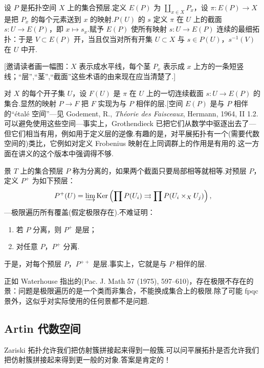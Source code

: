 \begin{aside}\label{asd:7.18}
设 $P$ 是拓扑空间 $X$ 上的集合预层.定义 $E(P)$ 为 $\coprod_{x \in X} P_x$，设 $\pi \colon E(P) \to X$ 是把 $P_x$ 的每个元素送到 $x$ 的映射.$P(U)$ 的 $s$ 定义 $\pi$ 在 $U$ 上的截面 $s \colon U \to E(P)$，即 $x \mapsto s_x$.赋予 $E(P)$ 使所有映射 $s \colon U \to E(P)$ 连续的最细拓扑：于是 $V \subset E(P)$ 开，当且仅当对所有开集 $U \subset X$ 与 $s \in P(U)$，$s^{-1}(V)$ 在 $U$ 中开.

[邀请读者画一幅图：$X$ 表示成水平线，每个茎 $P_x$ 表示成 $x$ 上方的一条短竖线；``层'',``茎'',``截面''这些术语的由来现在应当清楚了.]

对 $X$ 的每个开子集 $U$，设 $F(U)$ 是 $\pi$ 在 $U$ 上的一切连续截面 $s \colon U \to E(P)$ 的集合.显然的映射 $P \to F$ 把 $F$ 实现为与 $P$ 相伴的层.[空间 $E(P)$ 是与 $P$ 相伴的``\'etal\'e 空间''---见 Godement, R., \emph{Th\'eorie des Faisceaux}, Hermann, 1964, II 1.2.可以避免使用这些空间---事实上，Grothendieck 已把它们从数学中驱逐出去了---但它们相当有用，例如用于定义层的逆像.有趣的是，对平展拓扑有一个(需要代数空间的)类比，它例如对定义 Frobenius 映射在上同调群上的作用是有用的.这一方面在讲义的这个版本中强调得不够.
\end{aside}

\begin{aside}\label{asd:7.19}
景 $T$ 上的集合预层 $P$ 称为分离的，如果两个截面只要局部相等就相等.对预层 $P$，定义 $P^{+}$ 为如下预层：
\[
P^{+}(U) = \varinjlim \operatorname{Ker}\left( \prod P(U_i) \rightrightarrows \prod P(U_i \times_{X} U_j) \right),
\]
---极限遍历所有覆盖(假定极限存在).不难证明：
\begin{enumerate}
  \item 若 $P$ 分离，则 $P^{+}$ 是层；
  \item 对任意 $P$，$P^{+}$ 分离.
\end{enumerate}
于是，对每个预层 $P$，$P^{++}$ 是层.事实上，它就是与 $P$ 相伴的层.

正如 Waterhouse 指出的(Pac. J. Math 57 (1975), 597--610)，存在极限不存在的景：问题是极限遍历的是一个类而非集合，不能换成集合上的极限.除了可能 fpqc 景外，这似乎对实际使用的任何景都不是问题.
\end{aside}

\subsection*{Artin 代数空间}

Zariski 拓扑允许我们把仿射簇拼接起来得到一般簇.可以问平展拓扑是否允许我们把仿射簇拼接起来得到更一般的对象.答案是肯定的！

